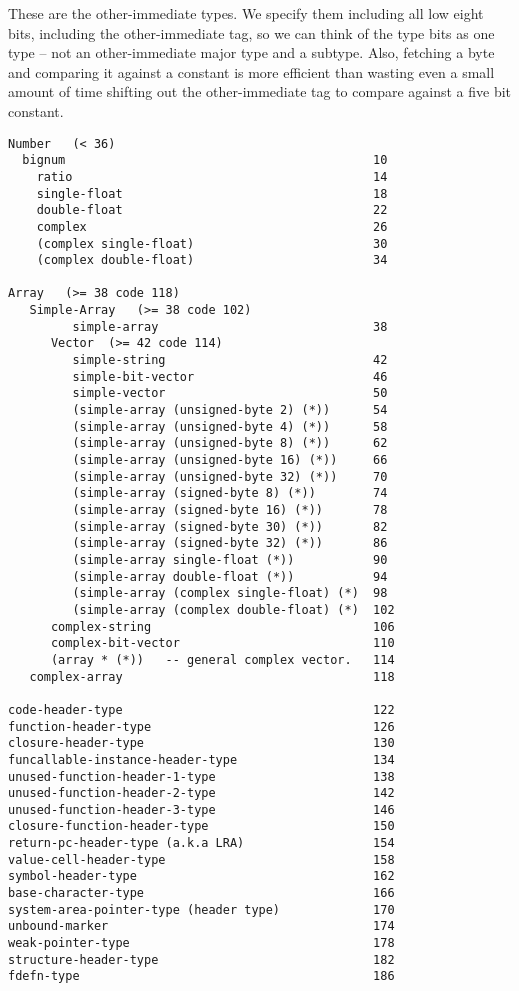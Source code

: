 \label{sec:data-blocks-and-o-i}
These are the other-immediate types.  We specify them including all low eight
bits, including the other-immediate tag, so we can think of the type bits as
one type -- not an other-immediate major type and a subtype.  Also, fetching a
byte and comparing it against a constant is more efficient than wasting even a
small amount of time shifting out the other-immediate tag to compare against a
five bit constant.
\begin{verbatim}
Number   (< 36)
  bignum                                           10
    ratio                                          14
    single-float                                   18
    double-float                                   22
    complex                                        26
    (complex single-float)                         30
    (complex double-float)                         34

Array   (>= 38 code 118)
   Simple-Array   (>= 38 code 102)
         simple-array                              38
      Vector  (>= 42 code 114)
         simple-string                             42
         simple-bit-vector                         46
         simple-vector                             50
         (simple-array (unsigned-byte 2) (*))      54
         (simple-array (unsigned-byte 4) (*))      58
         (simple-array (unsigned-byte 8) (*))      62
         (simple-array (unsigned-byte 16) (*))     66
         (simple-array (unsigned-byte 32) (*))     70
         (simple-array (signed-byte 8) (*))        74
         (simple-array (signed-byte 16) (*))       78
         (simple-array (signed-byte 30) (*))       82
         (simple-array (signed-byte 32) (*))       86
         (simple-array single-float (*))           90
         (simple-array double-float (*))           94
         (simple-array (complex single-float) (*)  98
         (simple-array (complex double-float) (*)  102
      complex-string                               106
      complex-bit-vector                           110
      (array * (*))   -- general complex vector.   114
   complex-array                                   118

code-header-type                                   122
function-header-type                               126
closure-header-type                                130
funcallable-instance-header-type                   134
unused-function-header-1-type                      138
unused-function-header-2-type                      142
unused-function-header-3-type                      146
closure-function-header-type                       150
return-pc-header-type (a.k.a LRA)                  154
value-cell-header-type                             158
symbol-header-type                                 162
base-character-type                                166
system-area-pointer-type (header type)             170
unbound-marker                                     174
weak-pointer-type                                  178
structure-header-type                              182
fdefn-type                                         186
\end{verbatim}

